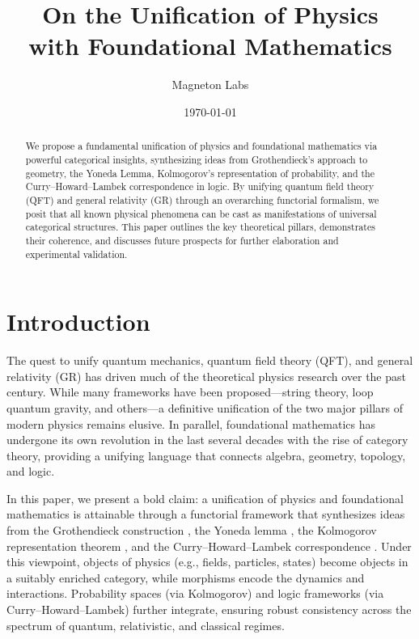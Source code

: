 \documentclass[12pt]{article}
\title{\bf On the Unification of Physics \\ with Foundational Mathematics}
\author{Magneton Labs}
\date{\today}
\begin{document}
\maketitle

\begin{abstract}
We propose a fundamental unification of physics and foundational mathematics via powerful categorical insights, synthesizing ideas from Grothendieck’s approach to geometry, the Yoneda Lemma, Kolmogorov’s representation of probability, and the Curry--Howard--Lambek correspondence in logic. By unifying quantum field theory (QFT) and general relativity (GR) through an overarching functorial formalism, we posit that all known physical phenomena can be cast as manifestations of universal categorical structures. This paper outlines the key theoretical pillars, demonstrates their coherence, and discusses future prospects for further elaboration and experimental validation.
\end{abstract}

\vspace{1em}

\section{Introduction}
The quest to unify quantum mechanics, quantum field theory (QFT), and general relativity (GR) has driven much of the theoretical physics research over the past century. While many frameworks have been proposed---string theory, loop quantum gravity, and others---a definitive unification of the two major pillars of modern physics remains elusive. In parallel, foundational mathematics has undergone its own revolution in the last several decades with the rise of category theory, providing a unifying language that connects algebra, geometry, topology, and logic. 

In this paper, we present a bold claim: a unification of physics and foundational mathematics is attainable through a functorial framework that synthesizes ideas from the Grothendieck construction \cite{Grothendieck1957}, the Yoneda lemma \cite{Yoneda1960}, the Kolmogorov representation theorem \cite{Kolmogorov1933}, and the Curry--Howard--Lambek correspondence \cite{Curry1934,Howard1980,Lambek1980}. Under this viewpoint, objects of physics (e.g., fields, particles, states) become objects in a suitably enriched category, while morphisms encode the dynamics and interactions. Probability spaces (via Kolmogorov) and logic frameworks (via Curry--Howard--Lambek) further integrate, ensuring robust consistency across the spectrum of quantum, relativistic, and classical regimes.
\end{document}
